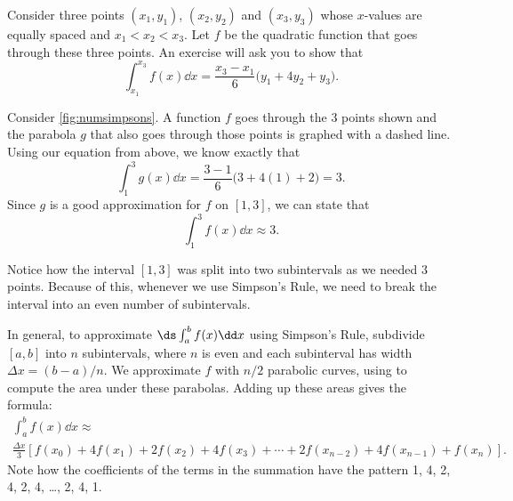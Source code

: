 Consider three points $(x_1,y_1)$, $(x_2,y_2)$ and $(x_3,y_3)$ whose $x$-values are equally spaced and $x_1<x_2<x_3$. Let $f$ be the quadratic function that goes through these three points. An exercise will ask you to show that 
\begin{equation}
\int_{x_1}^{x_3} f(x)\dd x = \frac{x_3-x_1}{6}\bigl(y_1+4y_2+y_3\bigr).\label{eq:simpsons}
\end{equation}


Consider \autoref{fig:numsimpsons}. A function $f$ goes through the 3 points shown and the parabola $g$ that also goes through those points is graphed with a dashed line. Using our equation from above, we know exactly that
\[\int_1^3 g(x)\dd x = \frac{3-1}{6}\bigl(3+4(1)+2\bigr)= 3.\]
Since $g$ is a good approximation for $f$ on $[1,3]$, we can state that
\[\int_1^3 f(x)\dd x \approx 3.\]

Notice how the interval $[1,3]$ was split into two subintervals as we needed 3 points. Because of this, whenever we use Simpson's Rule, we need to break the interval into an even number of subintervals. 

In general, to approximate $\ds \int_a^b f(x)\dd x$ using Simpson's Rule, subdivide $[a,b]$ into $n$ subintervals, where $n$ is even and each subinterval has width $\Delta x = (b-a)/n$. We approximate $f$ with $n/2$ parabolic curves, using  to compute the area under these parabolas. Adding up these areas gives the formula:
\begin{multline*}
\int_a^b f(x)\dd x\approx\\
\frac{\Delta x}3
\left[f(x_0)+4f(x_1)+2f(x_2)+4f(x_3)+\dotsb+2f(x_{n-2})+4f(x_{n-1})+f(x_n)\right].
\end{multline*}
Note how the coefficients of the terms in the summation have the pattern 1, 4, 2, 4, 2, 4, \dots, 2, 4, 1.

